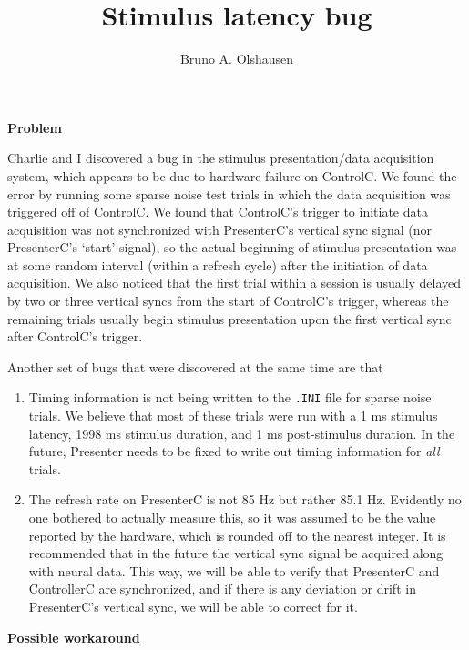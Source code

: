 \documentclass{article}
\begin{document}
\title{Stimulus latency bug}
\author{Bruno A. Olshausen}
\maketitle

\noindent
{\bf\large Problem}
\vspace{0.1in}

Charlie and I discovered a bug in the stimulus presentation/data
acquisition system, which appears to be due to hardware failure on
ControlC.  We found the error by running some sparse noise test trials
in which the data acquisition was triggered off of ControlC.  We found
that ControlC's trigger to initiate data acquisition was not
synchronized with PresenterC's vertical sync signal (nor PresenterC's
`start' signal), so the actual beginning of stimulus presentation was
at some random interval (within a refresh cycle) after the initiation
of data acquisition.  We also noticed that the first trial within a
session is usually delayed by two or three vertical syncs from the
start of ControlC's trigger, whereas the remaining trials usually
begin stimulus presentation upon the first vertical sync after
ControlC's trigger.

Another set of bugs that were discovered at the same time are that
\begin{enumerate}
\item Timing information is not being written to the {\tt .INI} file
for sparse noise trials.  We believe that most of these trials were
run with a 1 ms stimulus latency, 1998 ms stimulus duration, and 1 ms
post-stimulus duration.  In the future, Presenter needs to be fixed to
write out timing information for {\em all} trials.

\item The refresh rate on PresenterC is not 85 Hz but rather 85.1 Hz.
Evidently no one bothered to actually measure this, so it was assumed
to be the value reported by the hardware, which is rounded off to the
nearest integer.  It is recommended that in the future the vertical
sync signal be acquired along with neural data.  This way, we will be
able to verify that PresenterC and ControllerC are synchronized, and
if there is any deviation or drift in PresenterC's vertical sync, we
will be able to correct for it.
\end{enumerate}

\vspace{0.25in}
\noindent
{\bf\large Possible workaround}
\vspace{0.1in}
\end{document}
